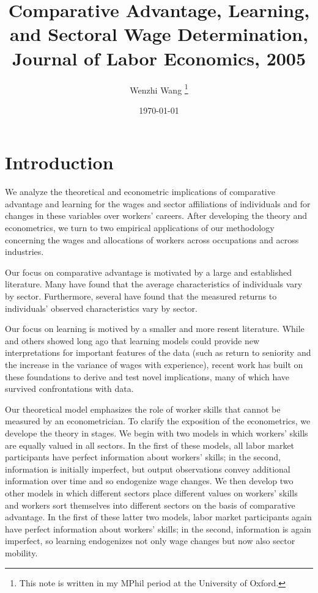 \documentclass[12pt]{article}
\theoremstyle{definition}
\begin{document}

\title{\bf Comparative Advantage, Learning, and Sectoral Wage Determination, Journal of Labor Economics, 2005}
\author{Wenzhi Wang \thanks{This note is written in my MPhil period at the University of Oxford.} } 
\date{\today}
\maketitle

\citet{gibbonsComparativeAdvantageLearning2005}

\section{Introduction}

We analyze the theoretical and econometric implications of comparative advantage and learning for the wages and sector affiliations of individuals and for changes in these variables over workers' careers. After developing the theory and econometrics, we turn to two empirical applications of our methodology concerning the wages and allocations of workers across occupations and across industries. 

Our focus on comparative advantage is motivated by a large and established literature. Many have found that the average characteristics of individuals vary by sector. Furthermore, several have found that the measured returns to individuals' observed characteristics vary by sector. 

Our focus on learning is motived by a smaller and more resent literature. While \citet{jovanovicJobMatchingTheory1979} and others showed long ago that learning models could provide new interpretations for important features of the data (such as return to seniority and the increase in the variance of wages with experience), recent work has built on these foundations to derive and test novel implications, many of which have survived confrontations with data. 

Our theoretical model emphasizes the role of worker skills that cannot be measured by an econometrician. To clarify the exposition of the econometrics, we develope the theory in stages. We begin with two models in which workers' skills are equally valued in all sectors. In the first of these models, all labor market participants have perfect information about workers' skills; in the second, information is initially imperfect, but output observations convey additional information over time and so endogenize wage changes. We then develop two other models in which different sectors place different values on workers' skills and workers sort themselves into different sectors on the basis of comparative advantage. In the first of these latter two models, labor market participants again have perfect information about workers' skills; in the second, information is again imperfect, so learning endogenizes not only wage changes but now also sector mobility. 
\end{document}
